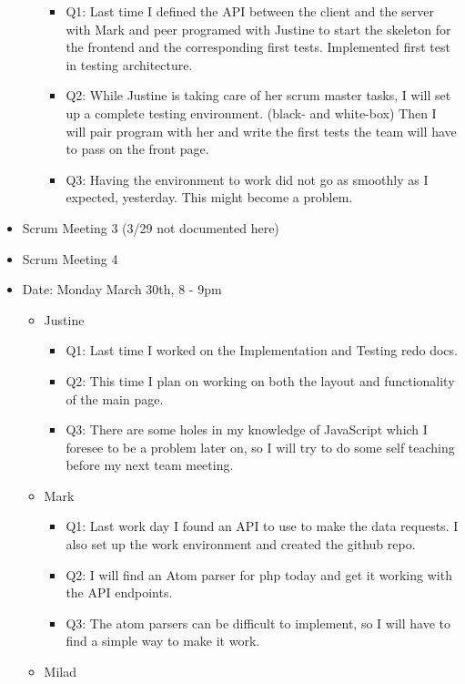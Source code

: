 \documentclass[]{article}
\begin{document}
\begin{itemize}
\begin{itemize}
    \begin{itemize}
    \itemsep1pt\parskip0pt
    \item
      Q1: Last time I defined the API between the client and the server
      with Mark and peer programed with Justine to start the skeleton
      for the frontend and the corresponding first tests. Implemented
      first test in testing architecture.
    \item
      Q2: While Justine is taking care of her scrum master tasks, I will
      set up a complete testing environment. (black- and white-box) Then
      I will pair program with her and write the first tests the team
      will have to pass on the front page.
    \item
      Q3: Having the environment to work did not go as smoothly as I
      expected, yesterday. This might become a problem.
    \end{itemize}
  \end{itemize}
\item
  Scrum Meeting 3 (3/29 not documented here)
\item
  Scrum Meeting 4
\item
  Date: Monday March 30th, 8 - 9pm

  \begin{itemize}
  \itemsep1pt\parskip0pt
  \item
    Justine

    \begin{itemize}
    \itemsep1pt\parskip0pt
    \item
      Q1: Last time I worked on the Implementation and Testing redo
      docs.
    \item
      Q2: This time I plan on working on both the layout and
      functionality of the main page.
    \item
      Q3: There are some holes in my knowledge of JavaScript which I
      foresee to be a problem later on, so I will try to do some self
      teaching before my next team meeting.
    \end{itemize}
  \item
    Mark

    \begin{itemize}
    \itemsep1pt\parskip0pt
    \item
      Q1: Last work day I found an API to use to make the data requests.
      I also set up the work environment and created the github repo.
    \item
      Q2: I will find an Atom parser for php today and get it working
      with the API endpoints.
    \item
      Q3: The atom parsers can be difficult to implement, so I will have
      to find a simple way to make it work.
    \end{itemize}
  \item
    Milad


\end{itemize}
\end{itemize}
\end{document}

